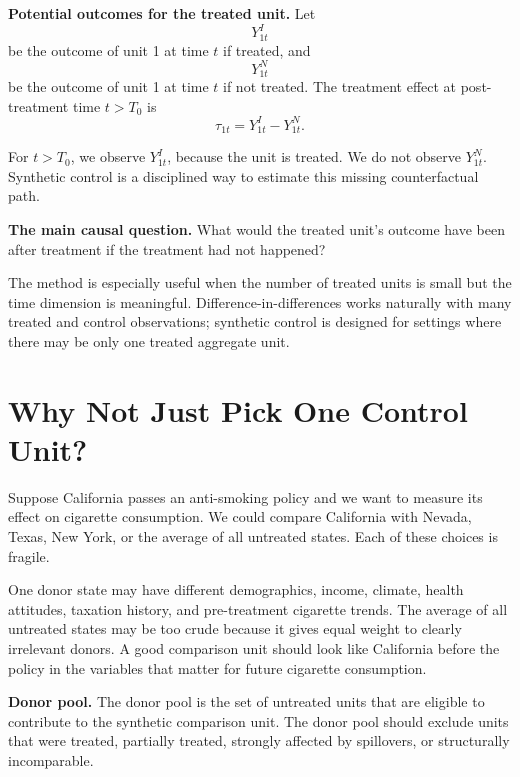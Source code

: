 \begin{defN}
\textbf{Potential outcomes for the treated unit.} Let
\[
Y^I_{1t}
\]
be the outcome of unit 1 at time \(t\) if treated, and
\[
Y^N_{1t}
\]
be the outcome of unit 1 at time \(t\) if not treated. The treatment effect at post-treatment time \(t>T_0\) is
\[
\tau_{1t}=Y^I_{1t}-Y^N_{1t}.
\]
\end{defN}

For \(t>T_0\), we observe \(Y^I_{1t}\), because the unit is treated. We do not observe \(Y^N_{1t}\). Synthetic control is a disciplined way to estimate this missing counterfactual path.

\begin{boxF}
\textbf{The main causal question.} What would the treated unit's outcome have been after treatment if the treatment had not happened?
\end{boxF}

The method is especially useful when the number of treated units is small but the time dimension is meaningful. Difference-in-differences works naturally with many treated and control observations; synthetic control is designed for settings where there may be only one treated aggregate unit.

\section{Why Not Just Pick One Control Unit?}

Suppose California passes an anti-smoking policy and we want to measure its effect on cigarette consumption. We could compare California with Nevada, Texas, New York, or the average of all untreated states. Each of these choices is fragile.

One donor state may have different demographics, income, climate, health attitudes, taxation history, and pre-treatment cigarette trends. The average of all untreated states may be too crude because it gives equal weight to clearly irrelevant donors. A good comparison unit should look like California before the policy in the variables that matter for future cigarette consumption.

\begin{defN}
\textbf{Donor pool.} The donor pool is the set of untreated units that are eligible to contribute to the synthetic comparison unit. The donor pool should exclude units that were treated, partially treated, strongly affected by spillovers, or structurally incomparable.
\end{defN}

